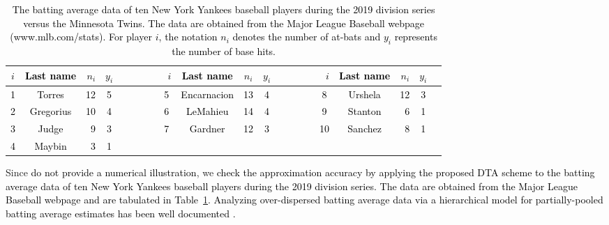\documentclass[12pt]{article}
\begin{document}
\begin{table}[t!]
\caption{\textcolor{black}{The  batting average data of ten New York Yankees baseball players during the 2019 division series versus the Minnesota Twins. The data are obtained from the Major League Baseball webpage (www.mlb.com/stats). For player $i$, the notation $n_i$ denotes the number of at-bats and $y_i$ represents the number of base hits.}}
\textcolor{black}{\begin{tabular}{ccrcccccccrcc}
$i$ & Last name  & $n_{i}$ & $y_{i}$ &~~~~~~~~$i$ & Last name & $n_{i}$ & $y_{i}$&  ~~~~~~~~$i$ & Last name & $n_{i}$ & $y_{i}$\\ 
\hline
1& Torres & 12 & 5 &  ~~~~~~~~5 & Encarnacion & 13 & 4 &~~~~~~~~8 & Urshela & 12 & 3 &\\
2& Gregorius & 10 & 4 &  ~~~~~~~~6 & LeMahieu& 14 & 4 &~~~~~~~~9 & Stanton & 6 & 1 &\\
3& Judge & 9 & 3 &  ~~~~~~~~7 & Gardner& 12 & 3 &~~~~~~~~10 & Sanchez & 8 & 1 &\\
4& Maybin & 3 & 1 &  ~~~~~ & & & &\\
\end{tabular}}\label{table3}
\end{table}



Since \cite{everson2002betabin} \textcolor{black}{do not provide a numerical illustration}, we  \textcolor{black}{check the approximation accuracy by applying the proposed DTA scheme to the batting average data of ten New York Yankees baseball players during the 2019 division series. The data are obtained from the Major League Baseball webpage and are tabulated in Table~\ref{table3}. Analyzing  over-dispersed batting average data via a hierarchical model for partially-pooled batting average estimates has been well documented  \citep{efron1975data, xianchao2012sure, tak2017rgbp}.}


\end{document}
